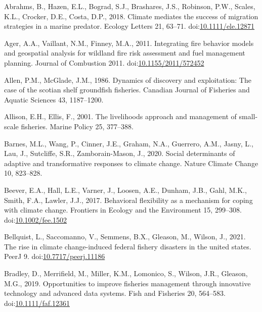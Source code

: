 \documentclass[]{elsarticle} %
\begin{document}
\leavevmode\hypertarget{ref-Abrahms2018}{}%
Abrahms, B., Hazen, E.L., Bograd, S.J., Brashares, J.S., Robinson, P.W.,
Scales, K.L., Crocker, D.E., Costa, D.P., 2018. Climate mediates the
success of migration strategies in a marine predator. Ecology Letters
21, 63--71.
doi:\href{https://doi.org/10.1111/ele.12871}{10.1111/ele.12871}

\leavevmode\hypertarget{ref-Ager2011}{}%
Ager, A.A., Vaillant, N.M., Finney, M.A., 2011. Integrating fire
behavior models and geospatial analysis for wildland fire risk
assessment and fuel management planning. Journal of Combustion 2011.
doi:\href{https://doi.org/10.1155/2011/572452}{10.1155/2011/572452}

\leavevmode\hypertarget{ref-Allen1986}{}%
Allen, P.M., McGlade, J.M., 1986. Dynamics of discovery and
exploitation: The case of the scotian shelf groundfish fisheries.
Canadian Journal of Fisheries and Aquatic Sciences 43, 1187--1200.

\leavevmode\hypertarget{ref-Allison2001}{}%
Allison, E.H., Ellis, F., 2001. The livelihoods approach and management
of small-scale fisheries. Marine Policy 25, 377--388.

\leavevmode\hypertarget{ref-barnes2020social}{}%
Barnes, M.L., Wang, P., Cinner, J.E., Graham, N.A., Guerrero, A.M.,
Jasny, L., Lau, J., Sutcliffe, S.R., Zamborain-Mason, J., 2020. Social
determinants of adaptive and transformative responses to climate change.
Nature Climate Change 10, 823--828.

\leavevmode\hypertarget{ref-Beever2017}{}%
Beever, E.A., Hall, L.E., Varner, J., Loosen, A.E., Dunham, J.B., Gahl,
M.K., Smith, F.A., Lawler, J.J., 2017. Behavioral flexibility as a
mechanism for coping with climate change. Frontiers in Ecology and the
Environment 15, 299--308.
doi:\href{https://doi.org/10.1002/fee.1502}{10.1002/fee.1502}

\leavevmode\hypertarget{ref-Bellquist2021}{}%
Bellquist, L., Saccomanno, V., Semmens, B.X., Gleason, M., Wilson, J.,
2021. The rise in climate change-induced federal fishery disasters in
the united states. PeerJ 9.
doi:\href{https://doi.org/10.7717/peerj.11186}{10.7717/peerj.11186}

\leavevmode\hypertarget{ref-Bradley2019}{}%
Bradley, D., Merrifield, M., Miller, K.M., Lomonico, S., Wilson, J.R.,
Gleason, M.G., 2019. Opportunities to improve fisheries management
through innovative technology and advanced data systems. Fish and
Fisheries 20, 564--583.
doi:\href{https://doi.org/10.1111/faf.12361}{10.1111/faf.12361}
\end{document}
